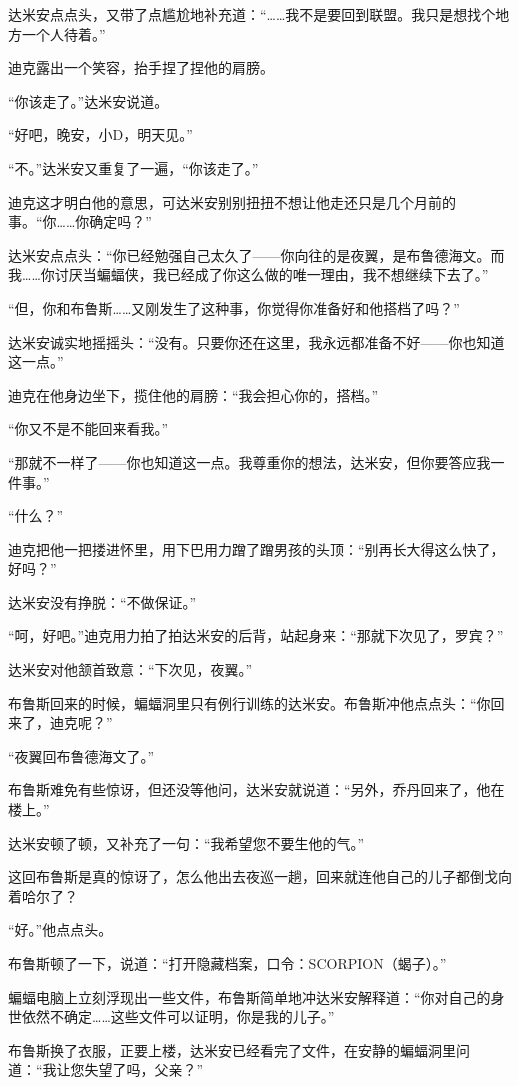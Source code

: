 \documentclass[../main]{subfiles}
\begin{document}
达米安点点头，又带了点尴尬地补充道：“……我不是要回到联盟。我只是想找个地方一个人待着。”

迪克露出一个笑容，抬手捏了捏他的肩膀。

“你该走了。”达米安说道。

“好吧，晚安，小D，明天见。”

“不。”达米安又重复了一遍，“你该走了。”

迪克这才明白他的意思，可达米安别别扭扭不想让他走还只是几个月前的事。“你……你确定吗？”

达米安点点头：“你已经勉强自己太久了——你向往的是夜翼，是布鲁德海文。而我……你讨厌当蝙蝠侠，我已经成了你这么做的唯一理由，我不想继续下去了。”

“但，你和布鲁斯……又刚发生了这种事，你觉得你准备好和他搭档了吗？”

达米安诚实地摇摇头：“没有。只要你还在这里，我永远都准备不好——你也知道这一点。”

迪克在他身边坐下，揽住他的肩膀：“我会担心你的，搭档。”

“你又不是不能回来看我。”

“那就不一样了——你也知道这一点。我尊重你的想法，达米安，但你要答应我一件事。”

“什么？”

迪克把他一把搂进怀里，用下巴用力蹭了蹭男孩的头顶：“别再长大得这么快了，好吗？”

达米安没有挣脱：“不做保证。”

“呵，好吧。”迪克用力拍了拍达米安的后背，站起身来：“那就下次见了，罗宾？”

达米安对他颔首致意：“下次见，夜翼。”

布鲁斯回来的时候，蝙蝠洞里只有例行训练的达米安。布鲁斯冲他点点头：“你回来了，迪克呢？”

“夜翼回布鲁德海文了。”

布鲁斯难免有些惊讶，但还没等他问，达米安就说道：“另外，乔丹回来了，他在楼上。”

达米安顿了顿，又补充了一句：“我希望您不要生他的气。”

这回布鲁斯是真的惊讶了，怎么他出去夜巡一趟，回来就连他自己的儿子都倒戈向着哈尔了？

“好。”他点点头。

布鲁斯顿了一下，说道：“打开隐藏档案，口令：SCORPION（蝎子）。”

蝙蝠电脑上立刻浮现出一些文件，布鲁斯简单地冲达米安解释道：“你对自己的身世依然不确定……这些文件可以证明，你是我的儿子。”

布鲁斯换了衣服，正要上楼，达米安已经看完了文件，在安静的蝙蝠洞里问道：“我让您失望了吗，父亲？”
\end{document}
